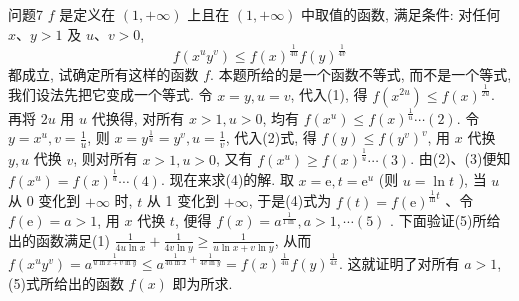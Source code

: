 问题7 $f$ 是定义在 $(1,+\infty)$ 上且在 $(1,+\infty)$ 中取值的函数, 满足条件: 对任何 $x 、 y>1$ 及 $u 、 v>0$,
$$
f\left(x^u y^v\right) \leqslant f(x)^{\frac{1}{4 u}} f(y)^{\frac{1}{4 v}}
$$
都成立, 试确定所有这样的函数 $f$.
本题所给的是一个函数不等式, 而不是一个等式, 我们设法先把它变成一个等式.
令 $x=y, u=v$, 代入(1), 得 $f\left(x^{2 u}\right) \leqslant f(x)^{\frac{1}{2 u}}$. 再将 $2 u$ 用 $u$ 代换得, 对所有 $x>1, u>0$, 均有 $f\left(x^u\right) \leqslant f(x)^{\frac{1}{u}} \cdots (2)$. 令 $y=x^u, v=\frac{1}{u}$, 则 $x=y^{\frac{1}{u}}=y^v, u=\frac{1}{v}$, 代入(2)式, 得 $f(y) \leqslant f\left(y^v\right)^v$, 用 $x$ 代换 $y, u$ 代换 $v$, 则对所有 $x>1, u>0$, 又有 $f\left(x^u\right) \geqslant f(x)^{\frac{1}{u}} \cdots (3)$. 由(2)、(3)便知 $f\left(x^u\right)= f(x)^{\frac{1}{u}}\cdots (4)$. 现在来求(4)的解.
取 $x=\mathrm{e}, t=\mathrm{e}^u$ (则 $u=\ln t$ ), 当 $u$ 从 0 变化到 $+\infty$ 时, $t$ 从 1 变化到 $+\infty$, 于是(4)式为 $f(t)=f(\mathrm{e})^{\frac{1}{\ln } t}$ 、令 $f(\mathrm{e})=a>1$, 用 $x$ 代换 $t$, 便得 $f(x)=a^{\frac{1}{1 \ln }}, a>1, \cdots(5)$ . 下面验证(5)所给出的函数满足(1) $\frac{1}{4 u \ln x}+\frac{1}{4 v \ln y} \geqslant \frac{1}{u \ln x+v \ln y}$, 从而 $f\left(x^u y^v\right)=a^{\frac{1}{u \ln x+v \ln y}} \leqslant a^{\frac{1}{4 u \ln x}+\frac{1}{4 v \ln y}}= f(x)^{\frac{1}{4 u}} f(y)^{\frac{1}{4 x}}$. 这就证明了对所有 $a>1$, (5)式所给出的函数 $f(x)$ 即为所求.



